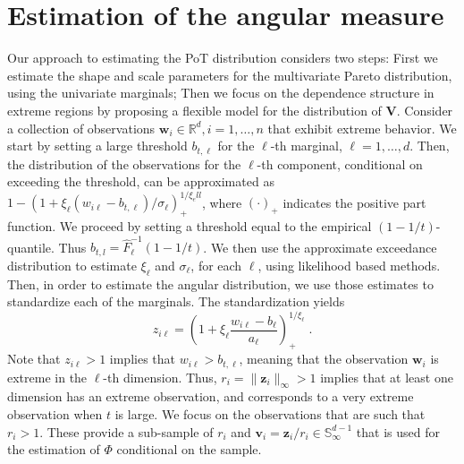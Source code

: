 \section{Estimation of the angular measure\label{sec:methodology}}

Our approach to estimating the PoT distribution considers two steps: First we 
    estimate the shape and scale parameters for the
    multivariate Pareto distribution, using the univariate marginals; Then 
    we focus on the dependence structure in extreme regions by proposing a 
    flexible model for the distribution of $\bm{V}$. Consider a collection of 
    observations  $\bm{w}_i \in {\mathbb R}^d, i = 1, \ldots, n$ that exhibit 
    extreme behavior.  We start by setting a large threshold 
    $b_{t,\ell}$ for the  $\ell$-th marginal, $\ell = 1, \ldots,d$. Then, the 
    distribution of the observations for the $\ell$-th component, 
    conditional on exceeding the threshold, can be 
    approximated as $1 - (1 + \xi_\ell   (w_{i\ell} - b_{t,\ell})/\sigma_\ell)_+^
    {1/\xi_ell}$, where $(\cdot)_+$ indicates the positive part function.  We 
    proceed by setting a threshold equal to the empirical $(1-1/t)$-quantile. 
    Thus $b_{t,l}  = \hat{F}^{-1}_{\ell}(1 - 1/t)$.  We then use the 
    approximate exceedance distribution to estimate $\xi_\ell$ and $\sigma_\ell$,
    for each $\ell$, using likelihood based methods. Then, in order to estimate 
    the angular distribution, we use those estimates to standardize each of 
    the marginals. The standardization yields
    \begin{equation}
            \label{eqn:standardization}
            z_{i\ell} = \left(1 + \xi_{\ell}\frac{w_{i\ell} -
                b_{\ell}}{a_{\ell}}\right)_{+}^{1/\xi_{\ell}}\; .
        \end{equation}
    Note that $z_{i\ell}> 1$ implies that $w_{i\ell} > b_{t,\ell}$, meaning 
    that the observation $\bm{w}_i$ is extreme in the $\ell$-th dimension. 
    Thus, $r_i = \|\bm{z}_i\|_\infty > 1$ implies that at
    least one dimension has an extreme observation, and corresponds 
    to a very extreme observation when $t$ is large. We focus on 
    the observations that are such that $r_i > 1$. These provide a
    sub-sample of $r_i$ and $\bm{v}_i = \bm{z}_i /r_i \in 
    \mathbb{S}_{\infty}^{d-1}$ that is used for  the estimation of 
    $\Phi$ conditional on the sample. 



